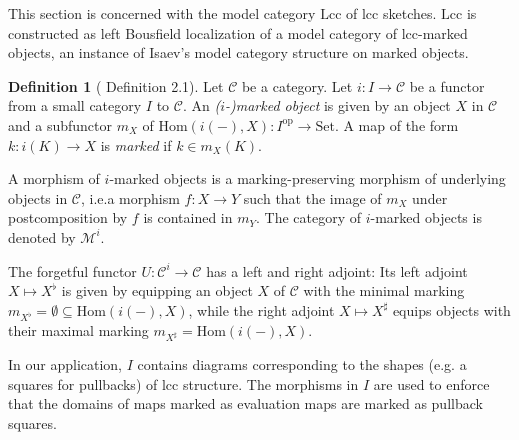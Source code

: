 \documentclass[a4paper]{article}
\theoremstyle{remark}
\theoremstyle{definition}
\newtheorem{definition}[theorem]{Definition}
\begin{document}
This section is concerned with the model category $\mathrm{Lcc}$ of lcc sketches.
$\mathrm{Lcc}$ is constructed as left Bousfield localization of a model category of lcc-marked objects, an instance of Isaev's model category structure on marked objects.

\begin{definition}[\cite{marked-objects} Definition 2.1]
  Let $\mathcal{C}$ be a category.
  Let $i : I \rightarrow \mathcal{C}$ be a functor from a small category $I$ to $\mathcal{C}$.
  An \emph{($i$-)marked object} is given by an object $X$ in $\mathcal{C}$ and a subfunctor $m_X$ of $\mathrm{Hom}(i(-), X) : I^\mathrm{op} \rightarrow \mathrm{Set}$.
  A map of the form $k : i(K) \rightarrow X$ is \emph{marked} if $k \in m_X(K)$.

  A morphism of $i$-marked objects is a marking-preserving morphism of underlying objects in $\mathcal{C}$, i.e.\@ a morphism $f : X \rightarrow Y$ such that the image of $m_X$ under postcomposition by $f$ is contained in $m_Y$.
  The category of $i$-marked objects is denoted by $\mathcal{M}^i$.
\end{definition}

The forgetful functor $U : \mathcal{C}^i \rightarrow \mathcal{C}$ has a left and right adjoint:
Its left adjoint $X \mapsto X^\flat$ is given by equipping an object $X$ of $\mathcal{C}$ with the minimal marking $m_{X^\flat} = \emptyset \subseteq \mathrm{Hom}(i(-), X)$, while the right adjoint $X \mapsto X^\sharp$ equips objects with their maximal marking $m_{X^\sharp} = \mathrm{Hom}(i(-), X)$.

In our application, $I$ contains diagrams corresponding to the shapes (e.g. a squares for pullbacks) of lcc structure.
The morphisms in $I$ are used to enforce that the domains of maps marked as evaluation maps are marked as pullback squares.
\end{document}
